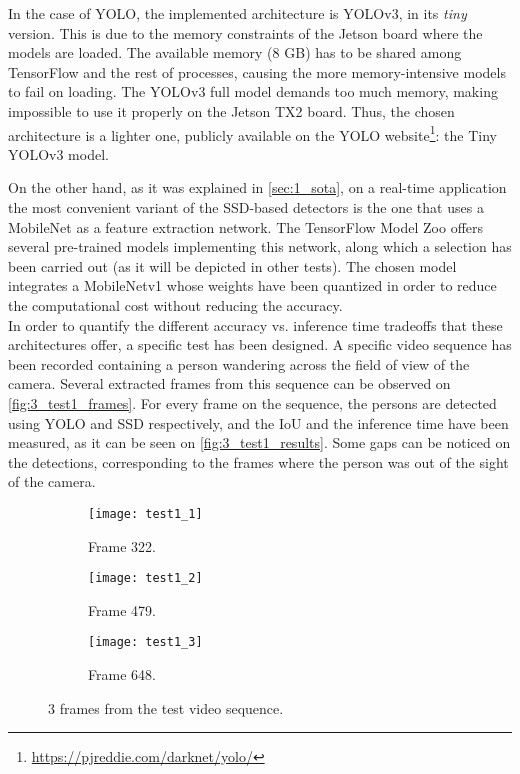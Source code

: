 In the case of YOLO, the implemented architecture is YOLOv3, in its \textit{tiny} version. This is due to the memory constraints of the Jetson board where the models are loaded. The available memory (8 GB) has to be shared among TensorFlow and the rest of processes, causing the more memory-intensive models to fail on loading. The YOLOv3 full model demands too much memory, making impossible to use it properly on the Jetson TX2 board. Thus, the chosen architecture is a lighter one, publicly available on the YOLO website\footnote{\url{https://pjreddie.com/darknet/yolo/}}: the Tiny YOLOv3 model.

On the other hand, as it was explained in \autoref{sec:1_sota}, on a real-time application the most convenient variant of the SSD-based detectors is the one that uses a MobileNet \cite{mobilenet} as a feature extraction network. The TensorFlow Model Zoo \cite{model_zoo} offers several pre-trained models implementing this network, along which a selection has been carried out (as it will be depicted in other tests). The chosen model integrates a MobileNetv1 whose weights have been quantized \cite{ssd_quantization} in order to reduce the computational cost without reducing the accuracy.\\


In order to quantify the different accuracy vs. inference time tradeoffs that these architectures offer, a specific test has been designed. A specific video sequence has been recorded containing a person wandering across the field of view of the camera. Several extracted frames from this sequence can be observed on \autoref{fig:3_test1_frames}. For every frame on the sequence, the persons are detected using YOLO and SSD respectively, and the IoU and the inference time have been measured, as it can be seen on \autoref{fig:3_test1_results}. Some gaps can be noticed on the detections, corresponding to the frames where the person was out of the sight of the camera.

\begin{figure}[h]
	\centering
	\begin{subfigure}[b]{0.3\linewidth}
		\centering
		\texttt{[image: test1\_1]}
		\caption{Frame 322.}
	\end{subfigure}
	\begin{subfigure}[b]{0.3\linewidth}
		\centering
		\texttt{[image: test1\_2]}
		\caption{Frame 479.}
	\end{subfigure}
	\begin{subfigure}[b]{0.3\linewidth}
		\centering
		\texttt{[image: test1\_3]}
		\caption{Frame 648.}
	\end{subfigure}
	\caption{3 frames from the test video sequence.}
	\label{fig:3_test1_frames}
\end{figure}



